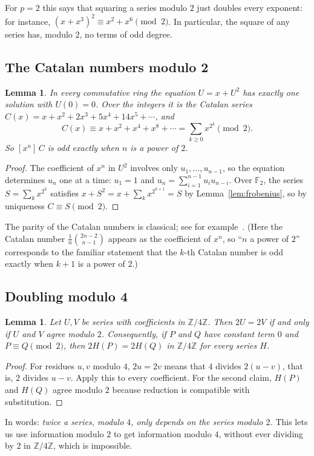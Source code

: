 \documentclass[11pt,a4paper]{article}
\newtheorem{lemma}[theorem]{Lemma}
\theoremstyle{definition}
\theoremstyle{remark}
\newcommand{\Z}{\mathbb{Z}}
\newcommand{\F}{\mathbb{F}}
\newcommand{\coeff}[2]{[x^{#1}]\,#2}
\begin{document}
For $p=2$ this says that squaring a series modulo $2$ just doubles every exponent: for instance,
$(x+x^3)^2\equiv x^2+x^6\pmod2$. In particular, the square of any series has, modulo $2$, no terms of odd degree.

\subsection{The Catalan numbers modulo 2}
\begin{lemma}\label{lem:catalan}
In every commutative ring the equation $U=x+U^2$ has exactly one solution with $U(0)=0$. Over the integers it is the
Catalan series $C(x)=x+x^2+2x^3+5x^4+14x^5+\cdots$, and
\[
C(x)\equiv x+x^2+x^4+x^8+\cdots=\sum_{k\ge0}x^{2^k}\pmod 2 .
\]
So $\coeff{n}{C}$ is odd exactly when $n$ is a power of $2$.
\end{lemma}

\begin{proof}
The coefficient of $x^n$ in $U^2$ involves only $u_1,\dots,u_{n-1}$, so the equation determines $u_n$ one at a time:
$u_1=1$ and $u_n=\sum_{i=1}^{n-1}u_iu_{n-i}$. Over $\F_2$, the series $S=\sum_kx^{2^k}$ satisfies
$x+S^2=x+\sum_kx^{2^{k+1}}=S$ by Lemma~\ref{lem:frobenius}, so by uniqueness $C\equiv S\pmod2$.
\end{proof}
The parity of the Catalan numbers is classical; see for example~\cite{deutschsagan}. (Here the Catalan number
$\frac1{n}\binom{2n-2}{n-1}$ appears as the coefficient of $x^n$, so ``$n$ a power of $2$'' corresponds to the familiar
statement that the $k$-th Catalan number is odd exactly when $k+1$ is a power of $2$.)

\subsection{Doubling modulo 4}
\begin{lemma}\label{lem:double}
Let $U,V$ be series with coefficients in $\Z/4\Z$. Then $2U=2V$ if and only if $U$ and $V$ agree modulo $2$.
Consequently, if $P$ and $Q$ have constant term $0$ and $P\equiv Q\pmod 2$, then $2H(P)=2H(Q)$ in $\Z/4\Z$ for every
series $H$.
\end{lemma}

\begin{proof}
For residues $u,v$ modulo $4$, $2u=2v$ means that $4$ divides $2(u-v)$, that is, $2$ divides $u-v$. Apply this to
every coefficient. For the second claim, $H(P)$ and $H(Q)$ agree modulo $2$ because reduction is compatible with
substitution.
\end{proof}
In words: \emph{twice a series, modulo $4$, only depends on the series modulo $2$.} This lets us use information modulo
$2$ to get information modulo $4$, without ever dividing by $2$ in $\Z/4\Z$, which is impossible.
\end{document}
